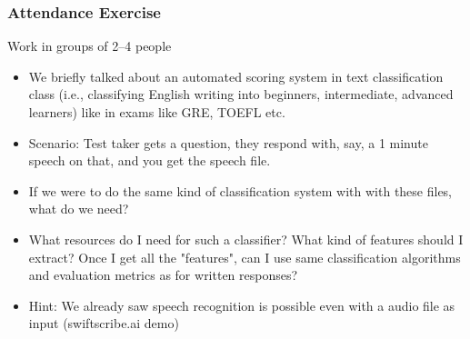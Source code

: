 \documentclass{beamer}
\begin{document}
\begin{frame}
\frametitle{Attendance Exercise}
Work in groups of 2--4 people
\begin{itemize}
\item We briefly talked about an automated scoring system in text classification class (i.e., classifying English writing into beginners, intermediate, advanced learners) like in exams like GRE, TOEFL etc. 
\item Scenario: Test taker gets a question, they respond with, say, a 1 minute speech on that, and you get the speech file. 
\item If we were to do the same kind of classification system with with these files, what do we need?
\item What resources do I need for such a classifier? What kind of features should I extract? Once I get all the "features", can I use same classification algorithms and evaluation metrics as for written responses?
\item Hint: We already saw speech recognition is possible even with a audio file as input (swiftscribe.ai demo)
\end{itemize}
\end{frame}
\end{document}
